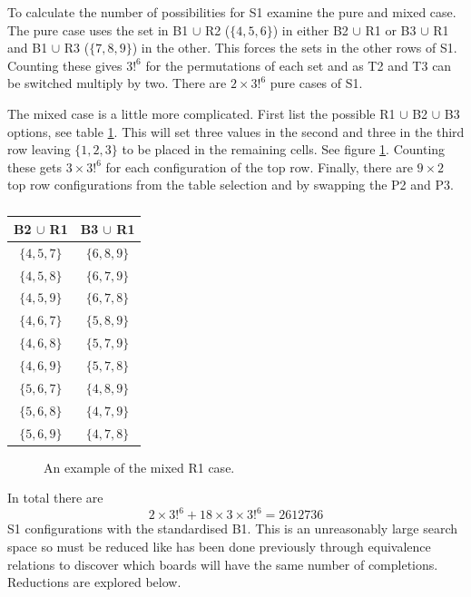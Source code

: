 \documentclass[a4paper,11pt]{report}
\newcounter{row}
\newcounter{col}
\newcommand\setrow[9]{
\setcounter{col}{1}
\foreach \n in {#1, #2, #3, #4, #5, #6, #7, #8, #9} {
\edef\x{\value{col} - 0.5}
\edef\y{9.5 - \value{row}}
\node[anchor=center] at (\x, \y) {\n};
\stepcounter{col}
}
\stepcounter{row}
}
\begin{document}
To calculate the number of possibilities for S1 examine the pure and mixed case. The pure case uses the set in B1 $\cup$ R2 ($\{4,5,6\}$) in either B2 $\cup$ R1 or B3 $\cup$ R1 and B1 $\cup$ R3 ($\{7,8,9\}$) in the other. This forces the sets in the other rows of S1. Counting these gives $3!^6$ for the permutations of each set and as T2 and T3 can be switched multiply by two. There are $2\times 3!^6$ pure cases of S1. 

The mixed case is a little more complicated. First list the possible R1 $\cup$ B2 $\cup$ B3 options, see table \ref{table:mixed99}. This will set three values in the second and three in the third row leaving $\{1,2,3\}$ to be placed in the remaining cells. See figure \ref{fig:91}. Counting these gets $3\times3!^6$ for each configuration of the top row. Finally, there are $9\times 2$ top row configurations from the table selection and by swapping the P2 and P3. 

\begin{table}[!h]
\begin{center}
\begin{tabular}{ |c|c| }
\hline
B2 $\cup$ R1 & B3 $\cup$ R1\\
\hline
$\{4,5,7\}$&$\{6,8,9\}$\\
$\{4,5,8\}$&$\{6,7,9\}$\\
$\{4,5,9\}$&$\{6,7,8\}$\\
$\{4,6,7\}$&$\{5,8,9\}$\\
$\{4,6,8\}$&$\{5,7,9\}$\\
$\{4,6,9\}$&$\{5,7,8\}$\\
$\{5,6,7\}$&$\{4,8,9\}$\\
$\{5,6,8\}$&$\{4,7,9\}$\\
$\{5,6,9\}$&$\{4,7,8\}$\\
\hline
\end{tabular}
\end{center}
\caption{\label{table:mixed99}}
\end{table}
\begin{figure}[h]
\centering
{}
\caption{An example of the mixed R1 case.}
\label{fig:91}
\end{figure}
In total there are
\begin{equation}2\times3!^6+18\times 3\times 3!^6 = 2612736\end{equation}
S1 configurations with the standardised B1. This is an unreasonably large search space so must be reduced like has been done previously through equivalence relations to discover which boards will have the same number of completions. Reductions are explored below.
\end{document}
